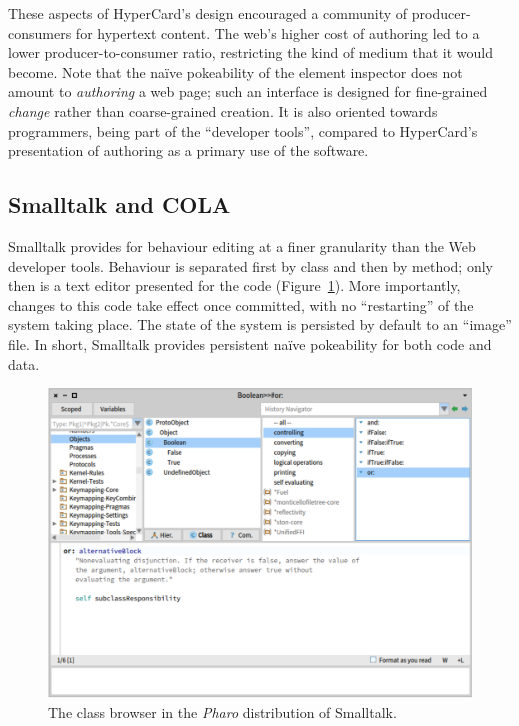 \documentclass[ twoside,openright,titlepage,numbers=noenddot,headinclude,footinclude,cleardoublepage=empty,abstract=on,
                BCOR=5mm,paper=a4,fontsize=11pt
                ]{scrreprt}
\theoremstyle{definition}
\begin{document}
These aspects of HyperCard's design encouraged a community of
producer-consumers for hypertext content. The web's higher cost of
authoring led to a lower producer-to-consumer ratio, restricting the
kind of medium that it would become. Note that the naïve pokeability of
the element inspector does not amount to \emph{authoring} a web page;
such an interface is designed for fine-grained \emph{change} rather than
coarse-grained creation. It is also oriented towards programmers, being
part of the ``developer tools'', compared to HyperCard's presentation of
authoring as a primary use of the software.

\hypertarget{smalltalk-and}{\subsection{\texorpdfstring{Smalltalk and
\acs{COLA}}{Smalltalk and }}\label{smalltalk-and}}

Smalltalk provides for behaviour editing at a finer granularity than the
Web developer tools. Behaviour is separated first by class and then by
method; only then is a text editor presented for the code
(Figure~\ref{fig:pharo}). More importantly, changes to this code take
effect once committed, with no ``restarting'' of the system taking
place. The state of the system is persisted by default to an ``image''
file. In short, Smalltalk provides persistent naïve pokeability for both
code and data.

\begin{figure}
\centering
\includegraphics[width=\linewidth]{pharo.png}
\caption[Pharo class browser]{The class browser in the \emph{Pharo} distribution of Smalltalk.}
\label{fig:pharo}
\end{figure}
\end{document}
